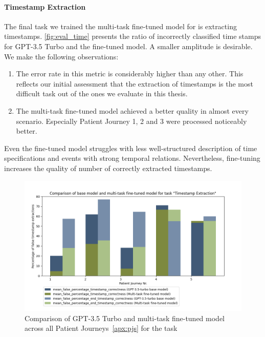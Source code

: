 \paragraph{Timestamp Extraction}
The final task we trained the multi-task fine-tuned model for is extracting timestamps. \autoref{fig:eval_time} presents the ratio of incorrectly classified time stamps for GPT-3.5 Turbo and the fine-tuned model. A smaller amplitude is desirable. We make the following observations:
\begin{enumerate}
    \item The error rate in this metric is considerably higher than any other. This reflects our initial assessment that the extraction of timestamps is the most difficult task out of the ones we evaluate in this thesis.
    \item The multi-task fine-tuned model achieved a better quality in almost every scenario. Especially Patient Journey 1, 2 and 3 were processed noticeably better.
\end{enumerate}
Even the fine-tuned model struggles with less well-structured description of time specifications and events with strong temporal relations. Nevertheless, fine-tuning increases the quality of number of correctly extracted timestamps.
\begin{figure}[h]
    \centering
    \captionsetup{belowskip=0pt,aboveskip=0pt}
    \includegraphics[width=\textwidth]{bachelor_thesis/images/timestamp_all_sorted.png}
    \caption{Comparison of GPT-3.5 Turbo and multi-task fine-tuned model across all Patient Journeys~\ref{apx:pjs} for the task }
    \label{fig:eval_time}
\end{figure}


